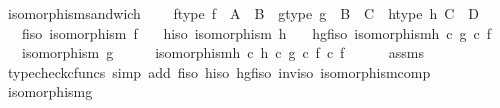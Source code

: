 \begin{isabellebody}
%
\isadelimproof
\isanewline
%
\endisadelimproof
\isanewline
{}\isamarkupfalse%
\ isomorphism{\isacharunderscore}{\kern0pt}sandwich{\isacharcolon}{\kern0pt}\ \isanewline
\ \ \ f{\isacharunderscore}{\kern0pt}type{\isacharcolon}{\kern0pt}\ {\isachardoublequoteopen}f\ {\isacharcolon}{\kern0pt}\ A\ {\isasymrightarrow}\ B{\isachardoublequoteclose}\ \ g{\isacharunderscore}{\kern0pt}type{\isacharcolon}{\kern0pt}\ {\isachardoublequoteopen}g\ {\isacharcolon}{\kern0pt}\ B\ {\isasymrightarrow}\ C{\isachardoublequoteclose}\ \ h{\isacharunderscore}{\kern0pt}type{\isacharcolon}{\kern0pt}\ {\isachardoublequoteopen}h{\isacharcolon}{\kern0pt}\ C\ {\isasymrightarrow}\ D{\isachardoublequoteclose}\isanewline
\ \ \ f{\isacharunderscore}{\kern0pt}iso{\isacharcolon}{\kern0pt}\ {\isachardoublequoteopen}isomorphism\ f{\isachardoublequoteclose}\isanewline
\ \ \ h{\isacharunderscore}{\kern0pt}iso{\isacharcolon}{\kern0pt}\ {\isachardoublequoteopen}isomorphism\ h{\isachardoublequoteclose}\isanewline
\ \ \ hgf{\isacharunderscore}{\kern0pt}iso{\isacharcolon}{\kern0pt}\ {\isachardoublequoteopen}isomorphism{\isacharparenleft}{\kern0pt}h\ {\isasymcirc}\isactrlsub c\ g\ {\isasymcirc}\isactrlsub c\ f{\isacharparenright}{\kern0pt}{\isachardoublequoteclose}\isanewline
\ \ \ {\isachardoublequoteopen}isomorphism\ g{\isachardoublequoteclose}\isanewline
%
\isadelimproof
%
\endisadelimproof
%
\isatagproof
{}\isamarkupfalse%
\ {\isacharminus}{\kern0pt}\isanewline
\ \ \isamarkupfalse%
\ {\isachardoublequoteopen}isomorphism{\isacharparenleft}{\kern0pt}h\isactrlbold {\isasyminverse}\ {\isasymcirc}\isactrlsub c\ {\isacharparenleft}{\kern0pt}h\ {\isasymcirc}\isactrlsub c\ g\ {\isasymcirc}\isactrlsub c\ f{\isacharparenright}{\kern0pt}\ {\isasymcirc}\isactrlsub c\ f\isactrlbold {\isasyminverse}{\isacharparenright}{\kern0pt}{\isachardoublequoteclose}\isanewline
\ \ \ \ \isamarkupfalse%
\ assms\ \isamarkupfalse%
\ {\isacharparenleft}{\kern0pt}typecheck{\isacharunderscore}{\kern0pt}cfuncs{\isacharcomma}{\kern0pt}\ simp\ add{\isacharcolon}{\kern0pt}\ f{\isacharunderscore}{\kern0pt}iso\ h{\isacharunderscore}{\kern0pt}iso\ hgf{\isacharunderscore}{\kern0pt}iso\ inv{\isacharunderscore}{\kern0pt}iso\ isomorphism{\isacharunderscore}{\kern0pt}comp{\isacharprime}{\kern0pt}{\isacharparenright}{\kern0pt}\isanewline
\ \ \isamarkupfalse%
\ \isamarkupfalse%
\ {\isachardoublequoteopen}isomorphism{\isacharparenleft}{\kern0pt}g{\isacharparenright}{\kern0pt}{\isachardoublequoteclose}\isanewline

\end{isabellebody}
